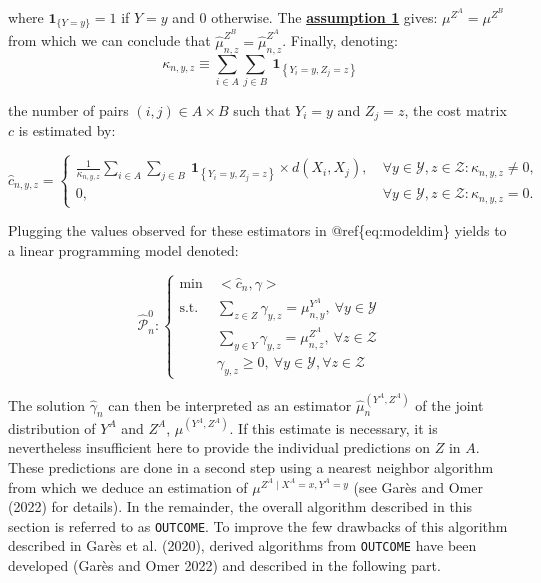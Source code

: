 where \(\mathbf{1}_{\{Y = y\}}=1\) if \(Y=y\) and \(0\) otherwise. The \protect\hyperlink{optt}{\textbf{assumption 1}} gives: \({\mu}^{Z^A}={\mu}^{Z^B}\) from which we can conclude that \(\hat{\mu}^{Z^B}_{n,z}=\hat{\mu}^{Z^A}_{n,z}\).
Finally, denoting: \[\kappa_{n,y,z}\equiv \sum_{i\in A} \sum_{j\in B}~ \mathbf{1}_{\left\{Y_i=y,Z_j=z\right\}}\]

the number of pairs \((i,j)\in A\times B\) such that \(Y_i=y\) and \(Z_j=z\), the cost matrix \(c\) is estimated by:

\begin{equation}
\hat{c}_{n,y,z}=\left\{ \begin{array}{ll} \frac{1}{\kappa_{n,y,z}}\sum_{i\in A} \sum_{j\in B}~ \mathbf{1}_{\left\{Y_i=y,Z_j=z\right\}} \times d(X_i,X_j), & \: \forall y\in \mathcal{Y}, z\in\mathcal{Z}:\kappa_{n,y,z}\neq 0,\\
 0, & \:\forall y \in \mathcal{Y}, z \in \mathcal{Z}:\kappa_{n,y,z} = 0.
\end{array}\right.
\label{eq:cost}
\end{equation}

Plugging the values observed for these estimators in @ref\{eq:modeldim\} yields to a linear programming model denoted:

\begin{equation}
\hat{\mathcal{P}}^0_n: \left\{
    \begin{aligned}
         \min\: & <\widehat{c}_n,\gamma>\\
                \text{s.t.}\:& \sum_{z\in Z} \gamma_{y,z} = \mu^{Y^A}_{n,y}, \:\forall y\in \mathcal{Y} \\
                & \sum_{y\in Y} \gamma_{y,z} = \mu^{Z^A}_{n,z}, \:\forall z\in \mathcal{Z} \\
                & \gamma_{y,z} \geq 0, \: \forall y\in \mathcal{Y}, \forall z\in \mathcal{Z}
    \end{aligned}\right.
    \label{eq:outco}
\end{equation}

The solution \(\hat{\gamma}_n\) can then be interpreted as an estimator \(\hat{\mu}^{(Y^A,Z^A)}_n\) of the joint distribution of \(Y^A\) and \(Z^A\), \(\mu^{(Y^A,Z^A)}\). If this estimate is necessary, it is nevertheless insufficient here to provide the individual predictions on \(Z\) in \(A\). These predictions are done in a second step using a nearest neighbor algorithm from which we deduce an estimation of \(\mu^{Z^A\mid X^A=x,Y^A=y}\) (see Garès and Omer (2022) for details). In the remainder, the overall algorithm described in this section is referred to as \texttt{OUTCOME}. To improve the few drawbacks of this algorithm described in Garès et al. (2020), derived algorithms from \texttt{OUTCOME} have been developed (Garès and Omer 2022) and described in the following part.

